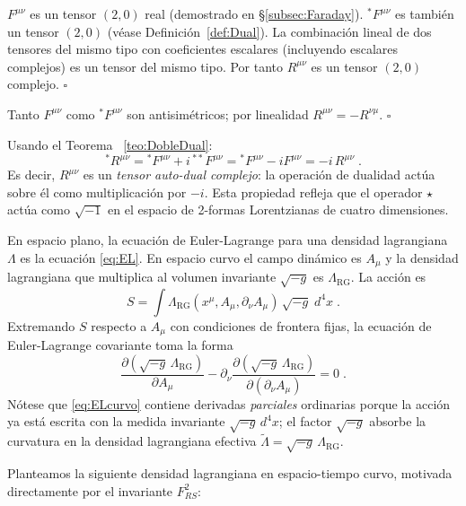             $F^{\mu\nu}$ es un tensor $(2,0)$ real (demostrado en \S\ref{subsec:Faraday}).  ${}^{*}F^{\mu\nu}$ es también un tensor $(2,0)$ (véase Definición~\ref{def:Dual}).  La combinación lineal de dos tensores del mismo tipo con coeficientes escalares (incluyendo escalares complejos) es un tensor del mismo tipo.  Por tanto $R^{\mu\nu}$ es un tensor $(2,0)$ complejo. $\square$

            Tanto $F^{\mu\nu}$ como ${}^{*}F^{\mu\nu}$ son antisimétricos; por linealidad $R^{\mu\nu}=-R^{\nu\mu}$. $\square$

            Usando el Teorema ~\ref{teo:DobleDual}:
            \begin{equation}\label{eq:AutoDual}
                {}^{*}R^{\mu\nu} = {}^{*}F^{\mu\nu} + i\,{}^{**}F^{\mu\nu} = {}^{*}F^{\mu\nu} - iF^{\mu\nu} = -i\,R^{\mu\nu}\;.
            \end{equation}
            Es decir, $R^{\mu\nu}$ es un \emph{tensor auto-dual complejo}: la operación de dualidad actúa sobre él como multiplicación por $-i$.  Esta propiedad refleja que el operador $\star$ actúa como $\sqrt{-1}$ en el espacio de 2-formas Lorentzianas de cuatro dimensiones.

            En espacio plano, la ecuación de Euler-Lagrange para una densidad lagrangiana $\Lambda$ es la ecuación \eqref{eq:EL}.  En espacio curvo el campo dinámico es $A_{\mu}$ y la densidad lagrangiana que multiplica al volumen invariante $\sqrt{-g}$ es $\Lambda_{\text{RG}}$.  La acción es
            \begin{equation*}
                S = \int\Lambda_{\text{RG}}(x^{\mu}, A_{\mu}, \partial_{\nu}A_{\mu}) \,\sqrt{-g}\;d^4x\;.
            \end{equation*}
            Extremando $S$ respecto a $A_{\mu}$ con condiciones de frontera fijas, la ecuación de Euler-Lagrange covariante toma la forma
            \begin{equation}\label{eq:ELcurvo}
                \frac{\partial(\sqrt{-g}\,\Lambda_{\text{RG}})}{\partial A_{\mu}} - \partial_{\nu} \frac{\partial(\sqrt{-g}\,\Lambda_{\text{RG}})}{\partial(\partial_{\nu}A_{\mu})} = 0\;.
            \end{equation}
            Nótese que \eqref{eq:ELcurvo} contiene derivadas \emph{parciales} ordinarias porque la acción ya está escrita con la medida invariante $\sqrt{-g}\,d^4x$; el factor $\sqrt{-g}$ absorbe la curvatura en la densidad lagrangiana efectiva $\tilde{\Lambda}=\sqrt{-g}\,\Lambda_{\text{RG}}$.

            Planteamos la siguiente densidad lagrangiana en espacio-tiempo curvo, motivada directamente por el invariante $F^2_{RS}$:

